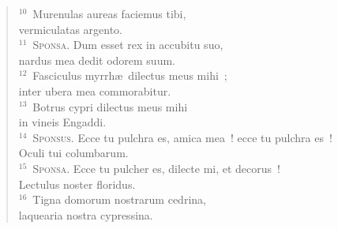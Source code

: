 \begin{flushleft}
\begin{verse}
${}^{10}$~Murenulas aureas faciemus tibi,\\ vermiculatas argento.\\
${}^{11}$~\textsc{Sponsa.} Dum esset rex in accubitu suo,\\ nardus mea dedit odorem suum.\\
${}^{12}$~Fasciculus myrrh\ae\ dilectus meus mihi~;\\ inter ubera mea commorabitur.\\
${}^{13}$~Botrus cypri dilectus meus mihi\\ in vineis Engaddi.\\
${}^{14}$~\textsc{Sponsus.} Ecce tu pulchra es, amica mea~! ecce tu pulchra es~!\\ Oculi tui columbarum.\\
${}^{15}$~\textsc{Sponsa.} Ecce tu pulcher es, dilecte mi, et decorus~!\\ Lectulus noster floridus.\\
${}^{16}$~Tigna domorum nostrarum cedrina,\\ laquearia nostra cypressina.\end{verse}\end{flushleft}



